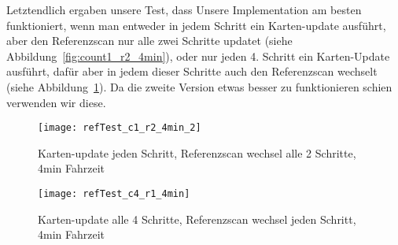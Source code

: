 Letztendlich ergaben unsere Test, dass Unsere Implementation am besten funktioniert, wenn man entweder in jedem Schritt ein Karten-update ausführt, aber den Referenzscan nur alle zwei Schritte updatet (siehe Abbildung~\ref{fig:count1_r2_4min}), oder nur jeden 4. Schritt ein Karten-Update ausführt, dafür aber in jedem dieser Schritte auch den Referenzscan wechselt (siehe Abbildung~\ref{fig:count4_r1_4min}). Da die zweite Version etwas besser zu funktionieren schien verwenden wir diese.

\begin{figure}
	\centering
	\texttt{[image: refTest\_c1\_r2\_4min\_2]}
	\caption{Karten-update jeden Schritt, Referenzscan wechsel alle 2 Schritte, 4min Fahrzeit\newline}
	\label{fig:count1_r2_4min}
	\texttt{[image: refTest\_c4\_r1\_4min]}
	\caption{Karten-update alle 4 Schritte, Referenzscan wechsel jeden Schritt, 4min Fahrzeit}
	\label{fig:count4_r1_4min}
\end{figure}
